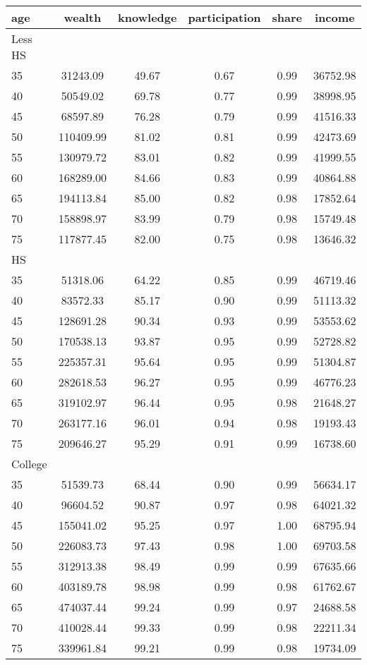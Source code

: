  \begin{tabular}{lccccc}
 \hline \hline
  age & wealth & knowledge & participation & share & income \\
 \hline
 Less HS & & & & & \\
 \hline
35 &  31243.09 &     49.67 &      0.67 &      0.99 &  36752.98 \\ 
40 &  50549.02 &     69.78 &      0.77 &      0.99 &  38998.95 \\ 
45 &  68597.89 &     76.28 &      0.79 &      0.99 &  41516.33 \\ 
50 & 110409.99 &     81.02 &      0.81 &      0.99 &  42473.69 \\ 
55 & 130979.72 &     83.01 &      0.82 &      0.99 &  41999.55 \\ 
60 & 168289.00 &     84.66 &      0.83 &      0.99 &  40864.88 \\ 
65 & 194113.84 &     85.00 &      0.82 &      0.98 &  17852.64 \\ 
70 & 158898.97 &     83.99 &      0.79 &      0.98 &  15749.48 \\ 
75 & 117877.45 &     82.00 &      0.75 &      0.98 &  13646.32 \\ 
 \hline
 HS & & & & & \\
 \hline
35 &  51318.06 &     64.22 &      0.85 &      0.99 &  46719.46 \\ 
40 &  83572.33 &     85.17 &      0.90 &      0.99 &  51113.32 \\ 
45 & 128691.28 &     90.34 &      0.93 &      0.99 &  53553.62 \\ 
50 & 170538.13 &     93.87 &      0.95 &      0.99 &  52728.82 \\ 
55 & 225357.31 &     95.64 &      0.95 &      0.99 &  51304.87 \\ 
60 & 282618.53 &     96.27 &      0.95 &      0.99 &  46776.23 \\ 
65 & 319102.97 &     96.44 &      0.95 &      0.98 &  21648.27 \\ 
70 & 263177.16 &     96.01 &      0.94 &      0.98 &  19193.43 \\ 
75 & 209646.27 &     95.29 &      0.91 &      0.99 &  16738.60 \\ 
 \hline
 College & & & & & \\
 \hline
35 &  51539.73 &     68.44 &      0.90 &      0.99 &  56634.17 \\ 
40 &  96604.52 &     90.87 &      0.97 &      0.98 &  64021.32 \\ 
45 & 155041.02 &     95.25 &      0.97 &      1.00 &  68795.94 \\ 
50 & 226083.73 &     97.43 &      0.98 &      1.00 &  69703.58 \\ 
55 & 312913.38 &     98.49 &      0.99 &      0.99 &  67635.66 \\ 
60 & 403189.78 &     98.98 &      0.99 &      0.98 &  61762.67 \\ 
65 & 474037.44 &     99.24 &      0.99 &      0.97 &  24688.58 \\ 
70 & 410028.44 &     99.33 &      0.99 &      0.98 &  22211.34 \\ 
75 & 339961.84 &     99.21 &      0.99 &      0.98 &  19734.09 \\ 
 \hline \hline
 \end{tabular}
